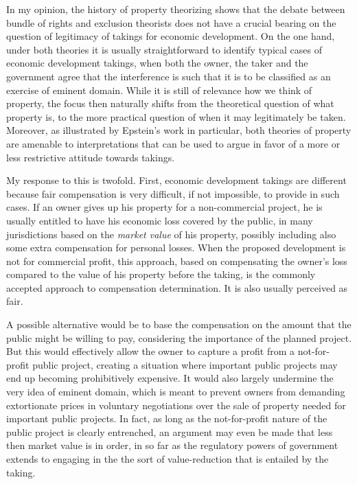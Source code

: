 In my opinion, the history of property theorizing shows that the debate between bundle of rights and exclusion theorists does not have a crucial bearing on the question of legitimacy of takings for economic development. On the one hand, under both theories it is usually straightforward to identify typical cases of economic development takings, when both the owner, the taker and the government agree that the interference is such that it is to be classified as an exercise of eminent domain. While it is still of relevance how we think of property, the focus then naturally shifts from the theoretical question of what property is, to the more practical question of when it may legitimately be taken. Moreover, as illustrated by Epstein's work in particular, both theories of property are amenable to interpretations that can be used to argue in favor of a more or less restrictive attitude towards takings. 

My response to this is twofold. First, economic development takings are different because fair compensation is very difficult, if not impossible, to provide in such cases. If an owner gives up his property for a non-commercial project, he is usually entitled to have his economic loss covered by the public, in many jurisdictions based on the {\it market value} of his property, possibly including also some extra compensation for personal losses. When the proposed development is not for commercial profit, this approach, based on compensating the owner's loss compared to the value of his property before the taking, is the commonly accepted approach to compensation determination. It is also usually perceived as fair. 

A possible alternative would be to base the compensation on the amount that the public might be willing to pay, considering the importance of the planned project. But this would effectively allow the owner to capture a profit from a not-for-profit public project, creating a situation where important public projects may end up becoming prohibitively expensive. It would also largely undermine the very idea of eminent domain, which is meant to prevent owners from demanding extortionate prices in voluntary negotiations over the sale of property needed for important public projects. In fact, as long as the not-for-profit nature of the public project is clearly entrenched, an argument may even be made that less then market value is in order, in so far as the regulatory powers of government extends to engaging in the the sort of value-reduction that is entailed by the taking. 

